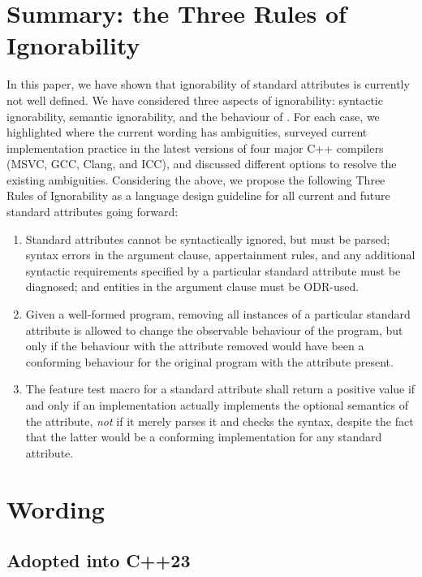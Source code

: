 \section{Summary: the Three Rules of Ignorability}

In this paper, we have shown that ignorability of standard attributes is currently not well defined. We have considered three aspects of ignorability: syntactic ignorability, semantic ignorability, and the behaviour of . For each case, we highlighted where the current wording has ambiguities, surveyed current implementation practice in the latest versions of four major C++ compilers (MSVC, GCC, Clang, and ICC), and discussed different options to resolve the existing ambiguities. Considering the above, we propose the following Three Rules of Ignorability as a language design guideline for all current and future standard attributes going forward:

\begin{enumerate}
\item Standard attributes cannot be syntactically ignored, but must be parsed; syntax errors in the argument clause, appertainment rules, and any additional syntactic requirements specified by a particular standard attribute must be diagnosed; and entities in the argument clause must be ODR-used.
\item Given a well-formed program, removing all instances of a particular standard attribute is allowed to change the observable behaviour of the program, but only if the behaviour with the attribute removed would have been a conforming behaviour for the original program with the attribute present.
\item The feature test macro for a standard attribute shall return a positive value if and only if an implementation actually implements the optional semantics of the attribute, \emph{not} if it merely parses it and checks the syntax, despite the fact that the latter would be a conforming implementation for any standard attribute.
\end{enumerate}

\section{Wording}
\label{sec:wording}

\subsection{Adopted into C++23}

